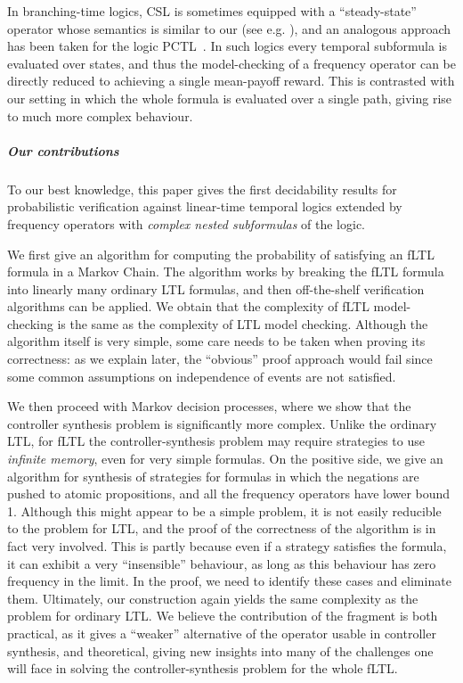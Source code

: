 \documentclass[a4paper,UKenglish]{lipics}
\begin{document}
In branching-time logics, CSL is sometimes equipped with a ``steady-state'' operator whose semantics is similar
to our  (see e.g. \cite{BHHK00}), and an analogous approach has been taken for the logic PCTL~\cite{kuvcera2005controller,de1998specify}.
In such logics every temporal subformula
is evaluated over states, and thus the model-checking of a frequency operator can be directly reduced to achieving a single mean-payoff reward.
This is contrasted with our setting in which the whole formula is evaluated over a single path, giving rise to much more complex
behaviour.

\subparagraph{Our contributions}
To our best knowledge, this paper gives the first decidability results for probabilistic verification against linear-time temporal logics extended by frequency operators with \emph{complex nested subformulas} of the logic.

We first give an algorithm for computing the probability of satisfying an fLTL formula in a Markov Chain.
The algorithm works by breaking the fLTL formula into linearly many ordinary LTL formulas, and then off-the-shelf
verification algorithms can be applied. We obtain that the complexity of fLTL model-checking
is the same as the complexity of LTL model checking. Although the algorithm itself is very simple, some
care needs to be taken when proving its correctness: as we explain later, the ``obvious'' proof approach would fail
since some common assumptions on independence of events are not satisfied.

We then proceed with Markov decision processes, where we show that the controller synthesis problem is significantly more complex.
Unlike the ordinary LTL, for fLTL the controller-synthesis problem may require strategies to use {\em infinite memory}, even
for very simple formulas. On the positive side, we give an algorithm for synthesis of strategies for formulas in which the
negations are pushed to atomic propositions, and all the frequency operators have lower bound 1. Although this might appear to be
a simple problem, it is not easily reducible to the problem for LTL, and the proof of the correctness of the algorithm is in
fact very involved.
This is partly because even if a strategy satisfies the formula, it can exhibit a very ``insensible'' behaviour,
as long as this behaviour has zero frequency in the limit. In the proof, we need to identify these cases and eliminate them.
Ultimately, our construction again yields the same complexity as the problem for ordinary LTL. We believe the contribution of
the fragment is both practical, as it gives a ``weaker'' alternative of the  operator usable in controller synthesis, and
theoretical, giving new insights into many of the challenges one will face in solving the controller-synthesis problem for the whole
fLTL.
\end{document}
